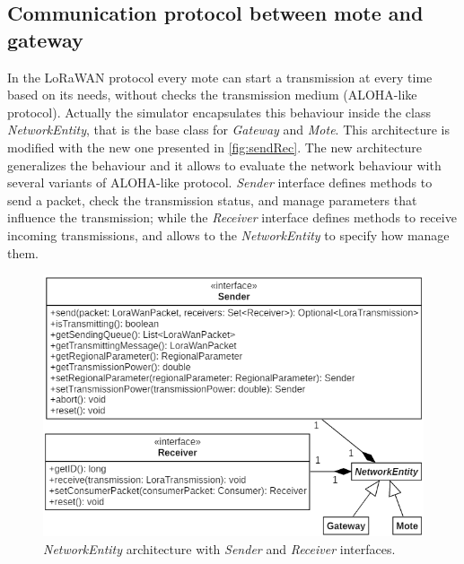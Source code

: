 \subsection{Communication protocol between mote and gateway}
In the LoRaWAN protocol every mote can start a transmission at every time based on its needs, without checks the transmission medium (ALOHA-like protocol).
Actually the simulator encapsulates this behaviour inside the class \mbox{\textit{NetworkEntity}}, that is the base class for \mbox{\textit{Gateway}} and \mbox{\textit{Mote}}. 
This architecture is modified with the new one presented in \autoref{fig:sendRec}. 
The new architecture generalizes the behaviour and it allows to evaluate the network behaviour with several variants of ALOHA-like protocol.
\mbox{\textit{Sender}} interface defines methods to send a packet, check the transmission status, and manage parameters that influence the transmission; while the \mbox{\textit{Receiver}} interface defines methods to receive incoming transmissions, and allows to the \mbox{\textit{NetworkEntity}} to specify how manage them.
\begin{figure}[h]
    \centering
    \includegraphics{figures/sendRec.png}
    \caption{\mbox{\textit{NetworkEntity}} architecture with \mbox{\textit{Sender}} and \mbox{\textit{Receiver}} interfaces.}
    \label{fig:sendRec}
\end{figure}

